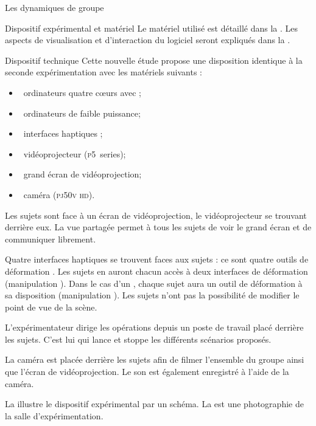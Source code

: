 \documentclass[myfrancais]{mythesis}
\begin{document}
\begin{mychapter}{Les dynamiques de groupe}
\begin{mysection}{Dispositif expérimental et matériel}
			Le matériel utilisé est détaillé dans la .
			Les aspects de visualisation et d'interaction du logiciel seront expliqués dans la .
			\begin{mysubsection}{Dispositif technique}
				Cette nouvelle étude propose une disposition identique à la seconde expérimentation  avec les matériels suivants :
				\begin{itemize}
					\item {}~ordinateurs quatre cœurs \myIntelCore avec ;
					\item {}~ordinateurs de faible puissance;
					\item {}~interfaces haptiques \myOmni;
					\item {}~vidéoprojecteur \myACER (\textsc{p5}~series);
					\item {}~grand écran de vidéoprojection;
					\item {}~caméra \mySony (\textsc{pj50v hd}).
				\end{itemize}

				Les sujets sont face à un écran de vidéoprojection, le vidéoprojecteur se trouvant derrière eux.
				La vue partagée permet à tous les sujets de voir le grand écran et de communiquer librement.

				Quatre interfaces haptiques se trouvent faces aux sujets : ce sont quatre outils de déformation  .
				Les sujets en  auront chacun accès à deux interfaces de déformation (manipulation ).
				Dans le cas d'un , chaque sujet aura un outil de déformation à sa disposition (manipulation ).
				Les sujets n'ont pas la possibilité de modifier le point de vue de la scène.

				L'expérimentateur dirige les opérations depuis un poste de travail placé derrière les sujets.
				C'est lui qui lance et stoppe les différents scénarios proposés.

				La caméra est placée derrière les sujets afin de filmer l'ensemble du groupe ainsi que l'écran de vidéoprojection.
				Le son est également enregistré à l'aide de la caméra.

				La  illustre le dispositif expérimental par un schéma.
				La  est une photographie de la salle d'expérimentation.


\end{mysubsection}
\end{mysection}
\end{mychapter}
\end{document}
